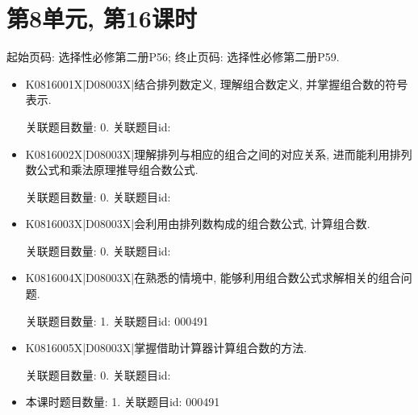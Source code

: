 \section*{第8单元, 第16课时}
起始页码: 选择性必修第二册P56; 终止页码: 选择性必修第二册P59.
\begin{itemize}
\item K0816001X|D08003X|结合排列数定义, 理解组合数定义, 并掌握组合数的符号表示.

关联题目数量: 0. 关联题目id: 

\item K0816002X|D08003X|理解排列与相应的组合之间的对应关系, 进而能利用排列数公式和乘法原理推导组合数公式.

关联题目数量: 0. 关联题目id: 

\item K0816003X|D08003X|会利用由排列数构成的组合数公式, 计算组合数.

关联题目数量: 0. 关联题目id: 

\item K0816004X|D08003X|在熟悉的情境中, 能够利用组合数公式求解相关的组合问题.

关联题目数量: 1. 关联题目id: 000491

\item K0816005X|D08003X|掌握借助计算器计算组合数的方法.

关联题目数量: 0. 关联题目id: 

\item 本课时题目数量: 1. 关联题目id: 000491

\end{itemize}


